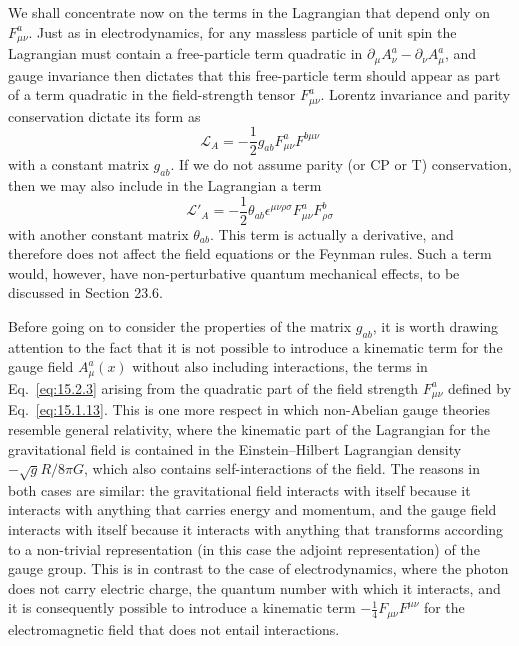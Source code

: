 We shall concentrate now on the terms in the Lagrangian that depend only on
$F^a_{\mu\nu}$. Just as in electrodynamics, for any massless particle of
unit spin the Lagrangian must contain a free-particle term quadratic in
$\partial_\mu A^a_\nu-\partial_\nu A^a_\mu$, and gauge invariance
then dictates that this free-particle term should appear as part of a term
quadratic in the field-strength tensor $F^a_{\mu\nu}$. Lorentz invariance
and parity conservation dictate its form as
\begin{equation}
 \mathcal L_A=-\frac12g_{ab}F^a_{\mu\nu}F^{b\mu\nu}
 \tag{15.2.3}\label{eq:15.2.3}
\end{equation}
with a constant matrix $g_{ab}$. If we do not assume parity (or CP or T)
conservation, then we may also include in the Lagrangian a term
\[
 \mathcal L'_A=-\frac12\theta_{ab}\epsilon^{\mu\nu\rho\sigma}
 F^a_{\mu\nu}F^b_{\rho\sigma}
\]
with another constant matrix $\theta_{ab}$. This term is actually a
derivative, and therefore does not affect the field equations or the Feynman
rules. Such a term would, however, have non-perturbative quantum mechanical
effects, to be discussed in Section 23.6.

Before going on to consider the properties of the matrix $g_{ab}$, it is
worth drawing attention to the fact that it is not possible to introduce a
kinematic term for the gauge field $A^a_\mu(x)$ without also including
interactions, the terms in Eq.~\eqref{eq:15.2.3} arising from the quadratic part
of the field strength $F^a_{\mu\nu}$ defined by
Eq.~\eqref{eq:15.1.13}. This is one more respect in which non-Abelian gauge
theories resemble general relativity, where the kinematic part of the Lagrangian
for the gravitational field is contained in the Einstein--Hilbert Lagrangian
density $-\sqrt{g}R/8\pi G$, which also contains self-interactions of the field.
The reasons in both cases are similar: the gravitational field interacts with
itself because it interacts with anything that carries energy and momentum, and
the gauge field interacts with itself because it interacts with anything that
transforms according to a non-trivial representation (in this case the adjoint
representation) of the gauge group. This is in contrast to the case of
electrodynamics, where the photon does not carry electric charge, the quantum
number with which it interacts, and it is consequently possible to introduce a
kinematic term $-\frac14F_{\mu\nu}F^{\mu\nu}$ for the electromagnetic field that
does not entail interactions.

